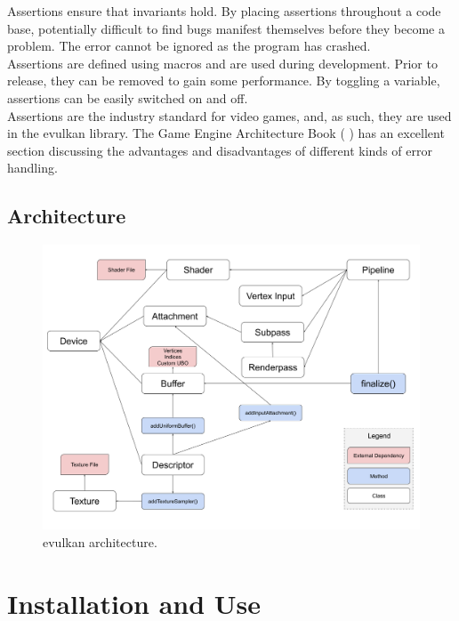 \documentclass[12pt]{report}
\newcommand{\citebu}[1]{(\citenoparen{#1})}
\newcommand{\citenoparen}[1]{\citeauthor{#1} \citeyear{#1}}
\theoremstyle{definition}
\begin{document}
          Assertions ensure that invariants hold. By placing assertions
          throughout a code base, potentially difficult to find bugs manifest
          themselves before they become a problem. The error cannot be ignored
          as the program has crashed. \\

          Assertions are defined using macros and are used during development.
          Prior to release, they can be removed to gain some performance. By
          toggling a variable, assertions can be easily switched on and off. \\

          Assertions are the industry standard for video games, and, as such,
          they are used in the evulkan library. The Game Engine Architecture Book \citebu{gameEngineBook}
          has an excellent section discussing the advantages and disadvantages of
          different kinds of error handling.

      \subsection{Architecture}

        \begin{figure}[h]
          \centering
          \includegraphics[width=\textwidth]{images/evk_architecture.png}
          \caption{evulkan architecture.}
          \label{fig:evulkan_architecture}  
        \end{figure}

    \section{Installation and Use}
\end{document}
